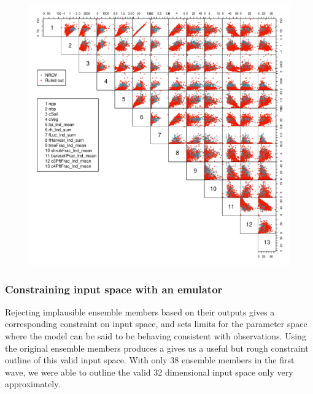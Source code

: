 \documentclass[gmd, manuscript]{copernicus}
\begin{document}
\begin{figure}[t]
\includegraphics[width=12cm]{./figs/output_pairs.pdf}
\caption{}
\label{fig:output_pairs}
\end{figure}


\subsubsection{Constraining input space with an emulator}\label{sssec:constraining_input_space_emulator}

Rejecting implausible ensemble members based on their outputs gives a corresponding constraint on input space, and sets limits for the parameter space where the model can be said to be behaving consistent with observations. Using the original ensemble members produces a  gives us a useful but rough constraint outline of this valid input space. With only 38 ensemble members in the first wave, we were able to outline the valid 32 dimensional input space only very approximately.
\end{document}
